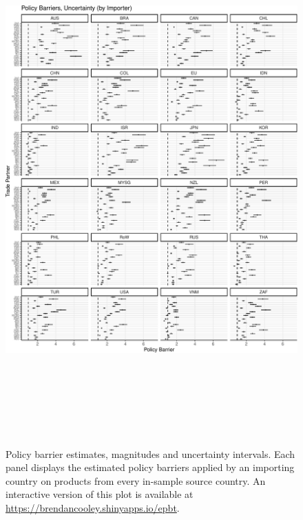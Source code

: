 \documentclass{puthesis}
\begin{document}
\begin{figure}
\centering
\includegraphics[width=6in,height=8in]{figure/tauq_ci.pdf}
\caption{Policy barrier estimates, magnitudes and uncertainty intervals.
Each panel displays the estimated policy barriers applied by an
importing country on products from every in-sample source country. An
interactive version of this plot is available at
\protect\url{https://brendancooley.shinyapps.io/epbt}.
\label{fig:tau_ci}}
\end{figure}
\end{document}
